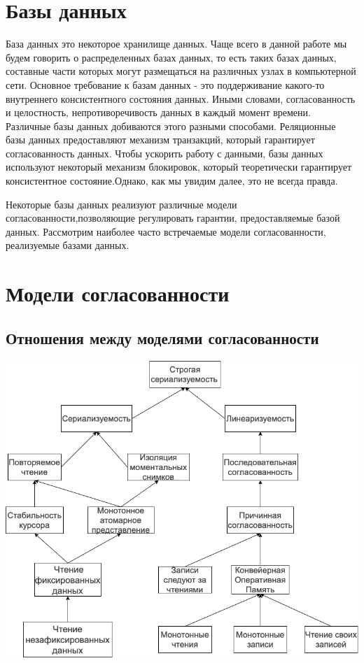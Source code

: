\documentclass[12pt,  openany]{book}
\begin{document}
\section{Базы данных}
База данных это некоторое хранилище данных.  Чаще всего в данной работе мы будем говорить о распределенных базах данных, то есть таких базах данных, составные части которых могут размещаться на различных узлах в компьютерной сети.
Основное требование к базам данных - это поддерживание какого-то внутреннего консистентного состояния данных. Иными словами, согласованность и целостность, непротиворечивость данных в каждый момент времени.
Различные базы данных добиваются этого разными способами. Реляционные базы данных предоставляют механизм транзакций, который гарантирует согласованность данных.
Чтобы ускорить работу с данными, базы данных используют некоторый механизм блокировок, который теоретически гарантирует консистентное состояние.Однако, как мы увидим далее, это не всегда правда.
\par
Некоторые базы данных реализуют различные модели согласованности,позволяющие регулировать гарантии, предоставляемые базой данных. Рассмотрим наиболее часто встречаемые модели согласованности, реализуемые базами данных.
\section{Модели согласованности \cite{jepsenConsistencyModels}}
\subsection{Отношения между моделями согласованности}
\includegraphics[scale=0.5]{model-consistency.png}
\end{document}
